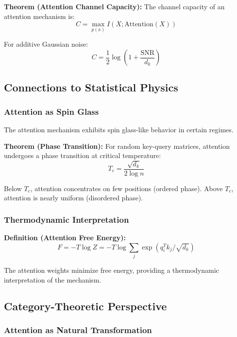 \textbf{Theorem (Attention Channel Capacity):} The channel capacity of an attention mechanism is:
\begin{equation}
C = \max_{p(x)} I(X; \text{Attention}(X))
\end{equation}

For additive Gaussian noise:
\begin{equation}
C = \frac{1}{2} \log\left(1 + \frac{\text{SNR}}{d_k}\right)
\end{equation}

\subsection{Connections to Statistical Physics}

\subsubsection{Attention as Spin Glass}

The attention mechanism exhibits spin glass-like behavior in certain regimes.

\textbf{Theorem (Phase Transition):} For random key-query matrices, attention undergoes a phase transition at critical temperature:
\begin{equation}
T_c = \frac{\sqrt{d_k}}{2\log n}
\end{equation}

Below $T_c$, attention concentrates on few positions (ordered phase). Above $T_c$, attention is nearly uniform (disordered phase).

\subsubsection{Thermodynamic Interpretation}

\textbf{Definition (Attention Free Energy):}
\begin{equation}
F = -T \log Z = -T \log \sum_j \exp(q_i^T k_j / \sqrt{d_k})
\end{equation}

The attention weights minimize free energy, providing a thermodynamic interpretation of the mechanism.

\subsection{Category-Theoretic Perspective}

\subsubsection{Attention as Natural Transformation}

